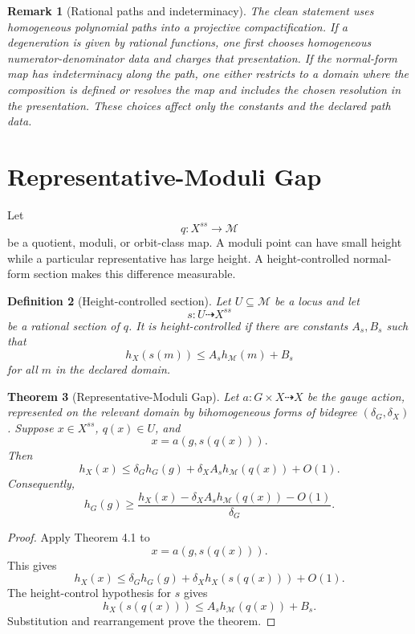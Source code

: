 \documentclass[11pt]{article}
\newtheorem{theorem}{Theorem}[section]
\newtheorem{definition}[theorem]{Definition}
\newtheorem{remark}[theorem]{Remark}
\begin{document}
\begin{remark}[Rational paths and indeterminacy]
The clean statement uses homogeneous polynomial paths into a projective compactification. If a degeneration is given by rational functions, one first chooses homogeneous numerator-denominator data and charges that presentation. If the normal-form map has indeterminacy along the path, one either restricts to a domain where the composition is defined or resolves the map and includes the chosen resolution in the presentation. These choices affect only the constants and the declared path data.
\end{remark}

\section{Representative-Moduli Gap}

Let
\[
q:X^{ss}\to\mathcal M
\]
be a quotient, moduli, or orbit-class map. A moduli point can have small height while a particular representative has large height. A height-controlled normal-form section makes this difference measurable.

\begin{definition}[Height-controlled section]
Let \(U\subseteq\mathcal M\) be a locus and let
\[
s:U\dashrightarrow X^{ss}
\]
be a rational section of \(q\). It is height-controlled if there are constants \(A_s,B_s\) such that
\[
h_X(s(m))\leq A_s h_{\mathcal M}(m)+B_s
\]
for all \(m\) in the declared domain.
\end{definition}

\begin{theorem}[Representative-Moduli Gap]
Let \(a:G\times X\dashrightarrow X\) be the gauge action, represented on the relevant domain by bihomogeneous forms of bidegree \((\delta_G,\delta_X)\). Suppose \(x\in X^{ss}\), \(q(x)\in U\), and
\[
x=a(g,s(q(x))).
\]
Then
\[
h_X(x)
\leq
\delta_G h_G(g)
+\delta_X A_s h_{\mathcal M}(q(x))
+O(1).
\]
Consequently,
\[
h_G(g)
\geq
\frac{
h_X(x)-\delta_X A_s h_{\mathcal M}(q(x))-O(1)
}{\delta_G}.
\]
\end{theorem}

\begin{proof}
Apply Theorem 4.1 to
\[
x=a(g,s(q(x))).
\]
This gives
\[
h_X(x)
\leq
\delta_G h_G(g)+\delta_X h_X(s(q(x)))+O(1).
\]
The height-control hypothesis for \(s\) gives
\[
h_X(s(q(x)))\leq A_s h_{\mathcal M}(q(x))+B_s.
\]
Substitution and rearrangement prove the theorem.
\end{proof}
\end{document}
